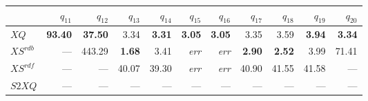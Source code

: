 \begin{tabular}{lrrrrrrrrrr}
\toprule
  & $q_{11}$ & $q_{12}$ & $q_{13}$ & $q_{14}$ & $q_{15}$ & $q_{16}$ & $q_{17}$ & $q_{18}$ & $q_{19}$ & $q_{20}$ \\
\midrule
$\mathit{XQ}$        & \textbf{93.40}  & \textbf{37.50}  & 3.34   & \textbf{3.31}   & \textbf{3.05}   & \textbf{3.05}   & 3.35   & 3.59   & \textbf{3.94}  & \textbf{3.34}  \\[0.15em]
$\mathit{XS^{rdb}}$  &  --- & 443.29   & \textbf{1.68}  & 3.41   & \textit{err}   & \textit{err}  & \textbf{2.90}  & \textbf{2.52}  & 3.99   & 71.41   \\[0.15em]
$\mathit{XS^{rdf}}$  &  --- &  --- & 40.07   & 39.30   & \textit{err} & \textit{err} & 40.90   & 41.55   & 41.58   &  --- \\[0.15em]
$\mathit{S2XQ}$      &  --- &  --- &  --- &  --- &  --- &  --- &  --- &  --- &  --- &  --- \\[0.15em]
\bottomrule
\end{tabular}
